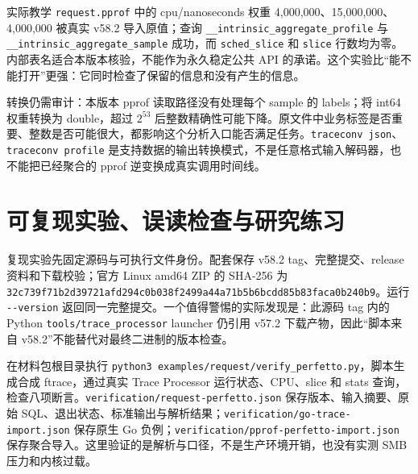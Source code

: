 \documentclass[UTF8,fontset=fandol,openany,11pt]{ctexbook}
\begin{document}
实际教学 \texttt{request.\allowbreak{}pprof} 中的 cpu/nanoseconds 权重 4,000,000、15,000,000、4,000,000 被真实 v58.2 导入原值；查询 \texttt{\_\allowbreak{}\_\allowbreak{}intrinsic\_\allowbreak{}aggregate\_\allowbreak{}profile} 与 \texttt{\_\allowbreak{}\_\allowbreak{}intrinsic\_\allowbreak{}aggregate\_\allowbreak{}sample} 成功，而 \texttt{sched\_\allowbreak{}slice} 和 \texttt{slice} 行数均为零。内部表名适合本版本核验，不能作为永久稳定公共 API 的承诺。这个实验比“能不能打开”更强：它同时检查了保留的信息和没有产生的信息。\cite{pf-validation}


转换仍需审计：本版本 pprof 读取路径没有处理每个 sample 的 labels；将 int64 权重转换为 double，超过 \(2^{53}\) 后整数精确性可能下降。原文件中业务标签是否重要、整数是否可能很大，都影响这个分析入口能否满足任务。\texttt{traceconv json}、\texttt{traceconv profile} 是支持数据的输出转换模式，不是任意格式输入解码器，也不能把已经聚合的 pprof 逆变换成真实调用时间线。\cite{pf-pprof}\cite{pf-traceconv}


\section{可复现实验、误读检查与研究练习}

复现实验先固定源码与可执行文件身份。配套保存 v58.2 tag、完整提交、release 资料和下载校验；官方 Linux amd64 ZIP 的 SHA-256 为 \texttt{32c739f7\allowbreak{}1b2d3972\allowbreak{}1afd294c\allowbreak{}0b038f24\allowbreak{}99a44a71\allowbreak{}b5b6bcdd\allowbreak{}85b83fac\allowbreak{}a0b240b9}。运行 \texttt{-\allowbreak{}-\allowbreak{}version} 返回同一完整提交。一个值得警惕的实际发现是：此源码 tag 内的 Python \texttt{tools/\allowbreak{}trace\_\allowbreak{}processor} launcher 仍引用 v57.2 下载产物，因此“脚本来自 v58.2”不能替代对最终二进制的版本检查。\cite{pf-release}\cite{pf-launcher}\cite{pf-validation}


在材料包根目录执行 \texttt{python3 examples/\allowbreak{}request/\allowbreak{}verify\_\allowbreak{}perfetto.\allowbreak{}py}，脚本生成合成 ftrace，通过真实 Trace Processor 运行状态、CPU、slice 和 stats 查询，检查八项断言。\texttt{verification/\allowbreak{}request-\allowbreak{}perfetto.\allowbreak{}json} 保存版本、输入摘要、原始 SQL、退出状态、标准输出与解析结果；\texttt{verification/\allowbreak{}go-\allowbreak{}trace-\allowbreak{}import.\allowbreak{}json} 保存原生 Go 负例；\texttt{verification/\allowbreak{}pprof-\allowbreak{}perfetto-\allowbreak{}import.\allowbreak{}json} 保存聚合导入。这里验证的是解析与口径，不是生产环境开销，也没有实测 SMB 压力和内核过载。\cite{pf-request}\cite{pf-validation}
\end{document}
